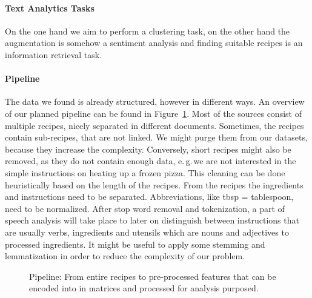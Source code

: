 \documentclass[
     12pt,         %
     a4paper,      %
     BCOR10mm,     %
     DIV14,        %
     ]{article}
\begin{document}
\paragraph{Text Analytics Tasks} On the one hand we aim to perform a clustering task, on the other hand the augmentation is somehow a sentiment analysis and finding suitable recipes is an information retrieval task. %

\paragraph{Pipeline} The data we found is already structured, however in different ways. An overview of our planned pipeline can be found in Figure~\ref{fig:pipeline}. Most of the sources consist of multiple recipes, nicely separated in different documents.
Sometimes, the recipes contain sub-recipes, that are not linked. We might purge them from our datasets, because they increase the complexity. Conversely, short recipes
might also be removed, as they do not contain enough data, e.\,g.\,we are not interested in the simple instructions on heating up a frozen pizza.
This cleaning can be done heuristically based on the length of the recipes. From the recipes the ingredients and instructions need to be separated. Abbreviations, like tbsp = tablespoon, need to be normalized.
After stop word removal and tokenization, a part of speech analysis will take place to later on distinguish between instructions that are usually verbs, ingredients and utensils which are nouns and adjectives to processed ingredients.
It might be useful to apply some stemming and lemmatization in order to reduce the complexity of our problem.


\begin{figure}[t!]
  \centering

  \caption{Pipeline: From entire recipes to pre-processed features that can be encoded into in matrices and processed for analysis purposed.}
  \label{fig:pipeline}
\end{figure}
\end{document}
